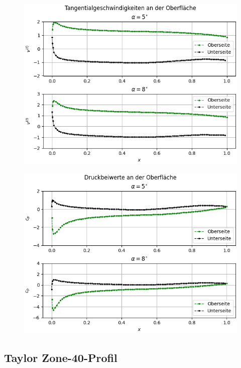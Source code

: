 \begin{figure}[H]
\begin{center} \includegraphics[scale=0.77]{figures/sc20614vtlines.png} \end{center}
\end{figure}
\begin{figure}[H]
\begin{center} \includegraphics[scale=0.77]{figures/sc20614cplines.png} \end{center}
\end{figure}


\newpage
\subsection{Taylor Zone-40-Profil}

